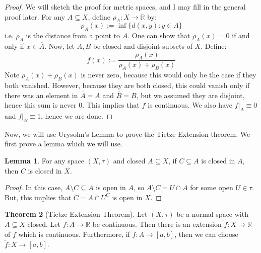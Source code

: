 \documentclass[11pt, oneside]{amsart}   	%
\theoremstyle{definition}
\newtheorem{theorem}{Theorem}[section]
\newtheorem{lemma}[theorem]{Lemma}
\begin{document}
	\begin{proof}
		We will sketch the proof for metric spaces, and I may fill in the general proof later. For any $A\subseteq X$, define 
		$\rho_A : X\rightarrow\mathbb R$ by:
		$$
			\rho_A(x) := \inf\{d(x, y) : y\in A\}
		$$
		i.e. $\rho_A$ is the distance from a point to $A$. One can show that $\rho_A(x) = 0$ if and only if $x\in \overline A$. 
		Now, let $A, B$ be closed and disjoint subsets of $X$. Define:
		$$
			f(x) := \frac{\rho_A(x)}{\rho_A(x) + \rho_B(x)}
		$$
		Note $\rho_A(x) + \rho_B(x)$ is never zero, because this would only be the case if they both vanished. However, 
		because they are both closed, this could vanish only if there was an element in $\overline A = A$ and $\overline B = 
		B$, but we assumed they are disjoint, hence this sum is never 0. This implies that $f$ is continuous. We also have 
		$f|_A\equiv 0$ and $f|_B\equiv 1$, hence we are done.
	\end{proof}
	
	Now, we will use Urysohn's Lemma to prove the Tietze Extension theorem. We first prove a lemma which we will 
	use.
	
	\begin{lemma}
		For any space $(X, \tau)$ and closed $A\subseteq X$, if $C\subseteq A$ is closed in $A$, then $C$ is closed in 
		$X$.
	\end{lemma}
	
	\begin{proof}
		In this case, $A\setminus C\subseteq A$ is open in $A$, so $A\setminus C = U\cap A$ for some open $U\in 
		\tau$. But, this implies that $C = A\cap U^C$ is open in $X$. 
	\end{proof}
	
	\begin{theorem}[Tietze Extension Theorem]
		Let $(X, \tau)$ be a normal space with $A\subseteq X$ closed. Let $f : A\rightarrow\mathbb R$ be continuous. 
		Then there is an extension $\tilde f : X\rightarrow\mathbb R$ of $f$ which is continuous. Furthermore, if $f : 
		A\rightarrow [a, b]$, then we can choose $\tilde f : X\rightarrow [a, b]$. 
	\end{theorem}
	
\end{document}
